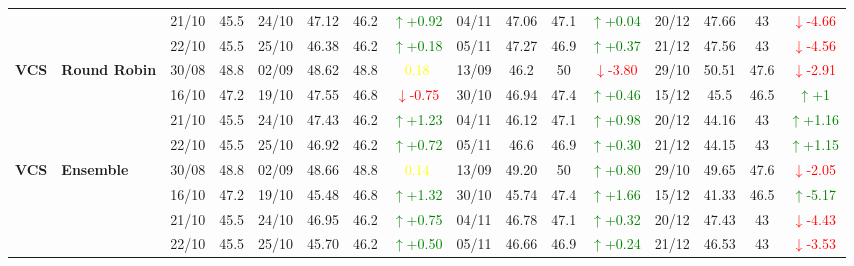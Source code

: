 \documentclass{ieeeaccess}
\begin{document}
\begin{table}[!h]
\begin{tabular}{llcc|cccc|cccc|cccc}
&
& 21/10 & 45.5 & 24/10 & 47.12 & 46.2 & \textcolor{green}{\(\uparrow\)+0.92} & 04/11 & 47.06 & 47.1 & \textcolor{green}{\(\uparrow\)+0.04} & 20/12 & 47.66 & 43 & \textcolor{red}{\(\downarrow\)-4.66} \\

&
& 22/10 & 45.5 & 25/10 & 46.38 & 46.2 & \textcolor{green}{\(\uparrow\)+0.18} & 05/11 & 47.27 & 46.9 & \textcolor{green}{\(\uparrow\)+0.37} & 21/12 & 47.56 & 43 & \textcolor{red}{\(\downarrow\)-4.56} \\
\midrule


\multirow{4}{*}{\textbf{VCS}} 
& \textbf{Round Robin}
& 30/08 & 48.8 & 02/09 & 48.62 & 48.8 & \textcolor{yellow}{0.18} & 13/09 & 46.2 & 50 & \textcolor{red}{\(\downarrow\)-3.80} & 29/10 & 50.51 & 47.6 & \textcolor{red}{\(\downarrow\)-2.91} \\

&
& 16/10 & 47.2 & 19/10 & 47.55 & 46.8 & \textcolor{red}{\(\downarrow\)-0.75} & 30/10 & 46.94 & 47.4 & \textcolor{green}{\(\uparrow\)+0.46} & 15/12 & 45.5 & 46.5 & \textcolor{green}{\(\uparrow\)+1} \\

&
& 21/10 & 45.5 & 24/10 & 47.43 & 46.2 & \textcolor{green}{\(\uparrow\)+1.23} & 04/11 & 46.12 & 47.1 & \textcolor{green}{\(\uparrow\)+0.98} & 20/12 & 44.16 & 43 & \textcolor{green}{\(\uparrow\)+1.16} \\

&
& 22/10 & 45.5 & 25/10 & 46.92 & 46.2 & \textcolor{green}{\(\uparrow\)+0.72} & 05/11 & 46.6 & 46.9 & \textcolor{green}{\(\uparrow\)+0.30} & 21/12 & 44.15 & 43 & \textcolor{green}{\(\uparrow\)+1.15} \\
\midrule



\multirow{4}{*}{\textbf{VCS}} 
& \textbf{Ensemble}
& 30/08 & 48.8 & 02/09 & 48.66 & 48.8 & \textcolor{yellow}{0.14} & 13/09 & 49.20 & 50 & \textcolor{green}{\(\uparrow\)+0.80} & 29/10 & 49.65 & 47.6 & \textcolor{red}{\(\downarrow\)-2.05} \\

&
& 16/10 & 47.2 & 19/10 & 45.48 & 46.8 & \textcolor{green}{\(\uparrow\)+1.32} & 30/10 & 45.74 & 47.4 & \textcolor{green}{\(\uparrow\)+1.66} & 15/12 & 41.33 & 46.5 & \textcolor{green}{\(\uparrow\)-5.17} \\

&
& 21/10 & 45.5 & 24/10 & 46.95 & 46.2 & \textcolor{green}{\(\uparrow\)+0.75} & 04/11 & 46.78 & 47.1 & \textcolor{green}{\(\uparrow\)+0.32} & 20/12 & 47.43 & 43 & \textcolor{red}{\(\downarrow\)-4.43} \\

&
& 22/10 & 45.5 & 25/10 & 45.70 & 46.2 & \textcolor{green}{\(\uparrow\)+0.50} & 05/11 & 46.66 & 46.9 & \textcolor{green}{\(\uparrow\)+0.24} & 21/12 & 46.53 & 43 & \textcolor{red}{\(\downarrow\)-3.53}  \\


\bottomrule
\end{tabular}
\end{table}
\end{document}
